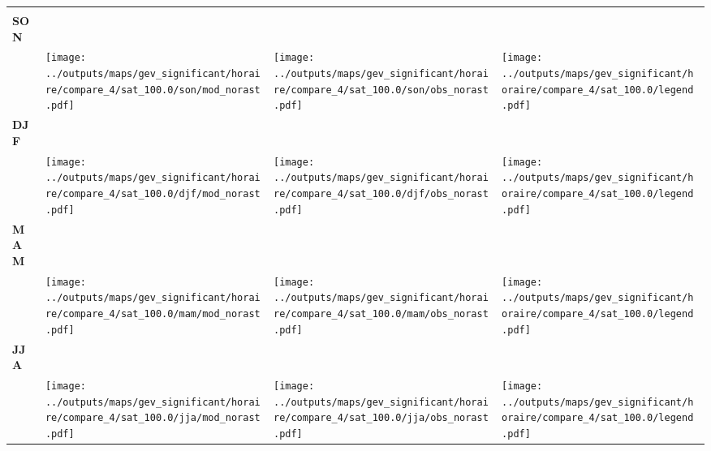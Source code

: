 \documentclass[
  letterpaper,
  DIV=11,
  numbers=noendperiod]{scrartcl}
\begin{document}
\begin{longtable*}{m{2.0cm}m{7.9cm}m{7.9cm}m{1cm}}
 & \centering  & \centering  & \tabularnewline
\centering \textbf{SON} \\[0.2em] \begin{tabular}{r@{\hspace{0.2em}}l}\end{tabular} & \centering \texttt{[image: ../outputs/maps/gev\_significant/horaire/compare\_4/sat\_100.0/son/mod\_norast.pdf]} & \centering \texttt{[image: ../outputs/maps/gev\_significant/horaire/compare\_4/sat\_100.0/son/obs\_norast.pdf]} & \centering \texttt{[image: ../outputs/maps/gev\_significant/horaire/compare\_4/sat\_100.0/legend.pdf]} \tabularnewline
\centering \textbf{DJF} \\[0.2em] \begin{tabular}{r@{\hspace{0.2em}}l}\end{tabular} & \centering \texttt{[image: ../outputs/maps/gev\_significant/horaire/compare\_4/sat\_100.0/djf/mod\_norast.pdf]} & \centering \texttt{[image: ../outputs/maps/gev\_significant/horaire/compare\_4/sat\_100.0/djf/obs\_norast.pdf]} & \centering \texttt{[image: ../outputs/maps/gev\_significant/horaire/compare\_4/sat\_100.0/legend.pdf]} \tabularnewline
\centering \textbf{MAM} \\[0.2em] \begin{tabular}{r@{\hspace{0.2em}}l}\end{tabular} & \centering \texttt{[image: ../outputs/maps/gev\_significant/horaire/compare\_4/sat\_100.0/mam/mod\_norast.pdf]} & \centering \texttt{[image: ../outputs/maps/gev\_significant/horaire/compare\_4/sat\_100.0/mam/obs\_norast.pdf]} & \centering \texttt{[image: ../outputs/maps/gev\_significant/horaire/compare\_4/sat\_100.0/legend.pdf]} \tabularnewline
\centering \textbf{JJA} \\[0.2em] \begin{tabular}{r@{\hspace{0.2em}}l}\end{tabular} & \centering \texttt{[image: ../outputs/maps/gev\_significant/horaire/compare\_4/sat\_100.0/jja/mod\_norast.pdf]} & \centering \texttt{[image: ../outputs/maps/gev\_significant/horaire/compare\_4/sat\_100.0/jja/obs\_norast.pdf]} & \centering \texttt{[image: ../outputs/maps/gev\_significant/horaire/compare\_4/sat\_100.0/legend.pdf]} \tabularnewline
\end{longtable*}
\end{document}
